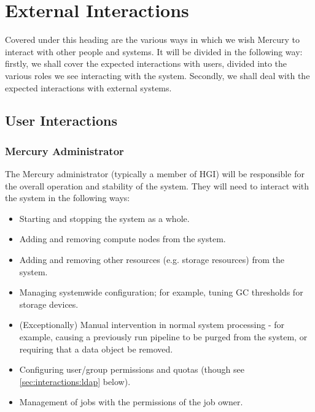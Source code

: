 \documentclass[10pt,a4paper]{article}
\newcommand{\npar}{\par\noindent\space}
\begin{document}
\section{External Interactions}
\npar Covered under this heading are the various ways in which we wish Mercury to interact with other people and systems. It will be divided in the following way: firstly, we shall cover the expected interactions with users, divided into the various roles we see interacting with the system. Secondly, we shall deal with the expected interactions with external systems.

\subsection{User Interactions}
\subsubsection{Mercury Administrator}
\npar The Mercury administrator (typically a member of HGI) will be responsible for the overall operation and stability of the system. They will need to interact with the system in the following ways:
\begin{itemize}
\item Starting and stopping the system as a whole.
\item Adding and removing compute nodes from the system.
\item Adding and removing other resources (e.g. storage resources) from the system.
\item Managing systemwide configuration; for example, tuning GC thresholds for storage devices.
\item (Exceptionally) Manual intervention in normal system processing - for example, causing a previously run pipeline to be purged from the system, or requiring that a data object be removed.
\item Configuring user/group permissions and quotas (though see \ref{sec:interactions:ldap} below).
\item Management of jobs with the permissions of the job owner.
\end{itemize}
\end{document}
